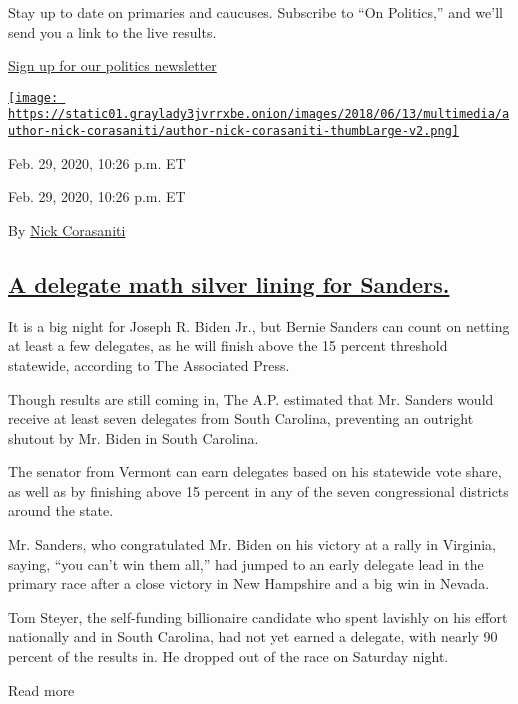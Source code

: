 Stay up to date on primaries and caucuses. Subscribe to ``On Politics,''
and we'll send you a link to the live results.

\href{https://www.nytimes3xbfgragh.onion/newsletters/politics}{Sign up
for our politics newsletter}

\href{https://www.nytimes3xbfgragh.onion/by/nick-corasaniti}{\texttt{[image: https://static01.graylady3jvrrxbe.onion/images/2018/06/13/multimedia/author-nick-corasaniti/author-nick-corasaniti-thumbLarge-v2.png]}}

Feb. 29, 2020, 10:26 p.m. ET

Feb. 29, 2020, 10:26 p.m. ET

By \href{https://www.nytimes3xbfgragh.onion/by/nick-corasaniti}{Nick
Corasaniti}

\hypertarget{a-delegate-math-silver-lining-for-sanders}{%
\subsection{\texorpdfstring{\protect\hyperlink{a-delegate-math-silver-lining-for-sanders}{A
delegate math silver lining for
Sanders.}}{A delegate math silver lining for Sanders.}}\label{a-delegate-math-silver-lining-for-sanders}}

It is a big night for Joseph R. Biden Jr., but Bernie Sanders can count
on netting at least a few delegates, as he will finish above the 15
percent threshold statewide, according to The Associated Press.

Though results are still coming in, The A.P. estimated that Mr. Sanders
would receive at least seven delegates from South Carolina, preventing
an outright shutout by Mr. Biden in South Carolina.

The senator from Vermont can earn delegates based on his statewide vote
share, as well as by finishing above 15 percent in any of the seven
congressional districts around the state.

Mr. Sanders, who congratulated Mr. Biden on his victory at a rally in
Virginia, saying, ``you can't win them all,'' had jumped to an early
delegate lead in the primary race after a close victory in New Hampshire
and a big win in Nevada.

Tom Steyer, the self-funding billionaire candidate who spent lavishly on
his effort nationally and in South Carolina, had not yet earned a
delegate, with nearly 90 percent of the results in. He dropped out of
the race on Saturday night.

Read more

